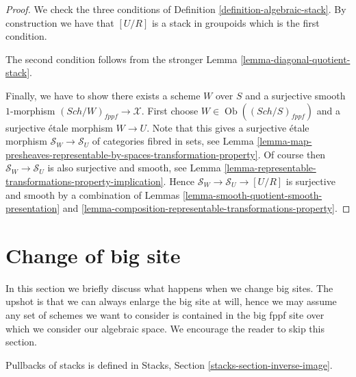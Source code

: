 \documentclass{stacks-project}
\theoremstyle{plain}
\theoremstyle{definition}
\theoremstyle{remark}
\numberwithin{equation}{subsection}
\def\Sch{\mathit{Sch}}
\def\Ob{\mathop{\mathrm{Ob}}\nolimits}
\begin{document}
\begin{proof}
We check the three conditions of
Definition \ref{definition-algebraic-stack}.
By construction we have that $[U/R]$ is a stack in groupoids
which is the first condition.

\medskip\noindent
The second condition follows from the stronger
Lemma \ref{lemma-diagonal-quotient-stack}.

\medskip\noindent
Finally, we have to show there exists a scheme $W$ over $S$
and a surjective smooth $1$-morphism
$(\Sch/W)_{fppf} \longrightarrow \mathcal{X}$.
First choose $W \in \Ob((\Sch/S)_{fppf})$ and a
surjective \'etale morphism $W \to U$. Note that this
gives a surjective \'etale morphism $\mathcal{S}_W \to \mathcal{S}_U$
of categories fibred in sets, see
Lemma
\ref{lemma-map-presheaves-representable-by-spaces-transformation-property}.
Of course then $\mathcal{S}_W \to \mathcal{S}_U$ is also surjective and
smooth, see
Lemma \ref{lemma-representable-transformations-property-implication}.
Hence $\mathcal{S}_W \to \mathcal{S}_U \to [U/R]$ is surjective
and smooth by a combination of
Lemmas \ref{lemma-smooth-quotient-smooth-presentation} and
\ref{lemma-composition-representable-transformations-property}.
\end{proof}





\section{Change of big site}
\label{section-change-big-site}

\noindent
In this section we briefly discuss what happens when we change big sites.
The upshot is that we can always enlarge the big site at will, hence we
may assume any set of schemes we want to consider is contained in the big
fppf site over which we consider our algebraic space.
We encourage the reader to skip this section.

\medskip\noindent
Pullbacks of stacks is defined in
Stacks, Section \ref{stacks-section-inverse-image}.
\end{document}

